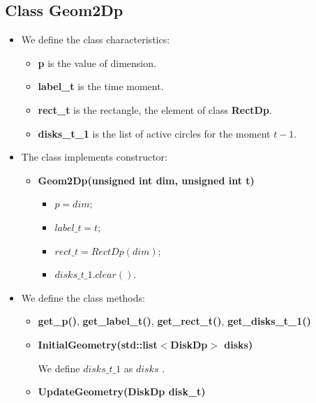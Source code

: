 \documentclass{report}
\begin{document}
	\subsection*{Class Geom2Dp}
	\label{Geom2Dp}

	\begin{itemize}
		\item We define the class characteristics: 
		\begin{itemize}
			\item {\bfseries p} is the value of dimension.
		
			\item {\bfseries label\_t} is the time moment.
		
			\item {\bfseries rect\_t} is the rectangle, the element of class {\bfseries RectDp}.
			
			\item {\bfseries disks\_t\_1} is the list of active circles for the moment $t-1$.
		\end{itemize}
	
		\item The class implements constructor:
		\begin{itemize}
			\item {\bfseries Geom2Dp(unsigned  int dim, unsigned  int t)}
				\begin{itemize}
					\item $p = dim$;
					\item $label\_t = t$;
					\item $rect\_t = RectDp(dim)$;
					\item $disks\_t\_1.clear()$.
				\end{itemize}	
		\end{itemize}
	
		\item We define the class methods:
	
		\begin{itemize}
			\item  {\bfseries get\_p()}, {\bfseries get\_label\_t()}, {\bfseries get\_rect\_t()}, {\bfseries get\_disks\_t\_1()}
		
			\item {\bfseries InitialGeometry(std::list$<$DiskDp$>$ disks)}  
		
			We define $disks\_t\_1$ as $disks$ .	
		
			\item {\bfseries UpdateGeometry(DiskDp disk\_t)} 
		

\end{itemize}
\end{itemize}
\end{document}
